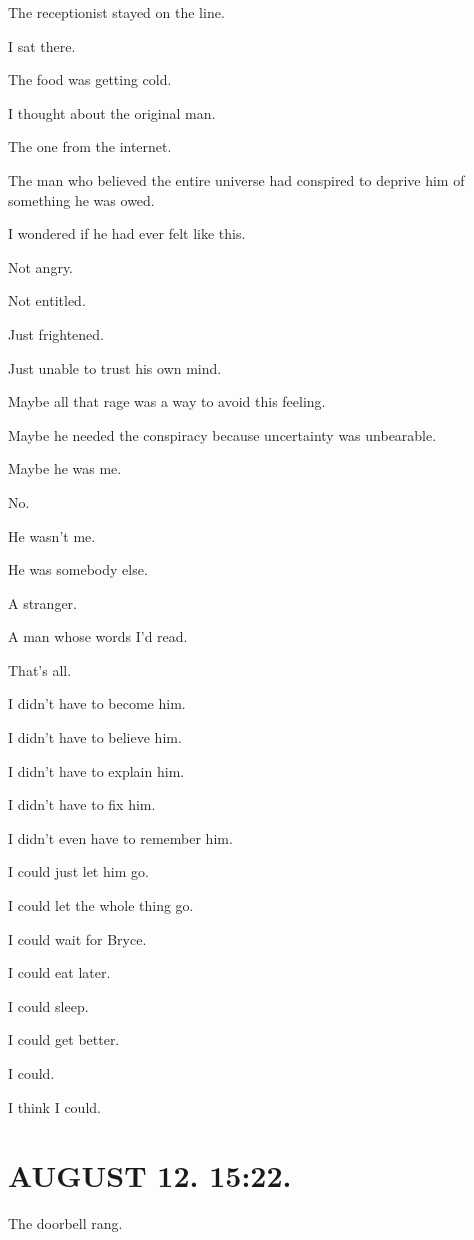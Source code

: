 \documentclass[11pt,oneside]{book}
\begin{document}
The receptionist stayed on the line.

I sat there.

The food was getting cold.

I thought about the original man.

The one from the internet.

The man who believed the entire universe had conspired to deprive him of something he was owed.

I wondered if he had ever felt like this.

Not angry.

Not entitled.

Just frightened.

Just unable to trust his own mind.

Maybe all that rage was a way to avoid this feeling.

Maybe he needed the conspiracy because uncertainty was unbearable.

Maybe he was me.

No.

He wasn't me.

He was somebody else.

A stranger.

A man whose words I'd read.

That's all.

I didn't have to become him.

I didn't have to believe him.

I didn't have to explain him.

I didn't have to fix him.

I didn't even have to remember him.

I could just let him go.

I could let the whole thing go.

I could wait for Bryce.

I could eat later.

I could sleep.

I could get better.

I could.

I think I could.

\section*{AUGUST 12. 15:22.}

The doorbell rang.
\end{document}
